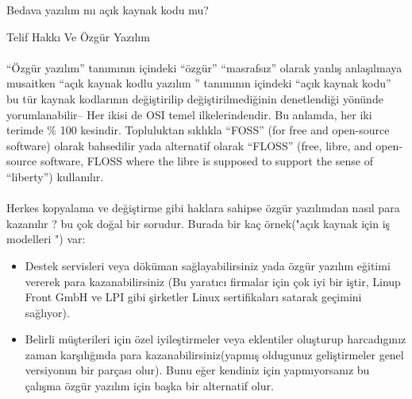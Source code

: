 \documentclass[10pt,a5paper]{book}
\begin{document}
\begin{section}{Bedava yazılım mı açık kaynak kodu mu?}
\begin{subsection}{Telif Hakkı Ve Özgür Yazılım}
\paragraph{}{“Özgür yazılım” tanımının içindeki “özgür” “masrafsız” olarak yanlış anlaşılmaya musaitken “açık kaynak kodlu yazılım ” tanımının içindeki “açık kaynak kodu” bu tür kaynak kodlarının değiştirilip değiştirilmediğinin denetlendiği yönünde yorumlanabilir-- Her ikisi de OSI temel ilkelerindendir. Bu anlamda, her iki terimde \% 100 kesindir. Topluluktan sıklıkla “FOSS” (for free and open-source software) olarak bahsedilir yada alternatif olarak “FLOSS” (free, libre, and open-source software, FLOSS where the libre is supposed to support the sense of “liberty”) kullanılır.}
\paragraph{}{Herkes kopyalama ve değiştirme gibi haklara sahipse özgür yazılımdan nasıl para kazanılır ? bu çok doğal bir sorudur. Burada bir kaç örnek("açık kaynak için iş modelleri ") var:}
\begin{itemize}
 \item Destek servisleri veya döküman sağlayabilirsiniz yada özgür yazılım eğitimi vererek para kazanabilirsiniz (Bu yaratıcı firmalar için çok iyi bir iştir, Linup Front GmbH ve LPI gibi şirketler Linux sertifikaları satarak geçimini sağlıyor).
 \item Belirli müşterileri için özel iyileştirmeler veya eklentiler oluşturup harcadıgınız zaman karşılığında para kazanabilirsiniz(yapmış oldugunuz geliştirmeler genel versiyonun bir parçası olur). Bunu eğer kendiniz için yapmıyorsanız bu çalışma özgür yazılım için başka bir alternatif olur.

\end{itemize}
\end{subsection}
\end{section}
\end{document}
